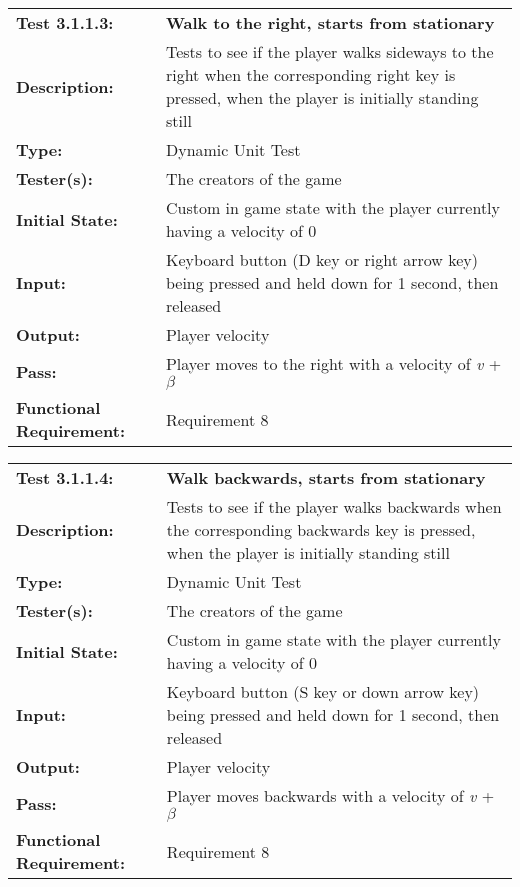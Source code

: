\documentclass[12pt, titlepage]{article}
\begin{document}
\begin{mdframed}[linewidth=1pt]
\begin{tabularx}{\textwidth}{@{}p{3cm}X@{}}
{\bf Test 3.1.1.3:} & {\bf Walk to the right, starts from stationary}\\[\baselineskip]
{\bf Description:} & Tests to see if the player walks sideways to the right when the corresponding right key is pressed, when the player is initially standing still\\[0.5\baselineskip]
{\bf Type:} & Dynamic Unit Test\\[0.5\baselineskip]
{\bf Tester(s):} & The creators of the game\\[0.5\baselineskip]
{\bf Initial State:} & Custom in game state with the player currently having a velocity of 0\\[0.5\baselineskip]
{\bf Input:} & Keyboard button (D key or right arrow key) being pressed and held down for 1 second, then released\\[0.5\baselineskip]
{\bf Output:} & Player velocity\\[0.5\baselineskip]
{\bf Pass:} & Player moves to the right with a velocity of \textit{v} + $\beta$ \\[0.5\baselineskip]
{\bf Functional Requirement:} & Requirement 8
\end{tabularx}
\end{mdframed}

\begin{mdframed}[linewidth=1pt]
\begin{tabularx}{\textwidth}{@{}p{3cm}X@{}}
{\bf Test 3.1.1.4:} & {\bf Walk backwards, starts from stationary}\\[\baselineskip]
{\bf Description:} & Tests to see if the player walks backwards when the corresponding backwards key is pressed, when the player is initially standing still\\[0.5\baselineskip]
{\bf Type:} & Dynamic Unit Test\\[0.5\baselineskip]
{\bf Tester(s):} & The creators of the game\\[0.5\baselineskip]
{\bf Initial State:} & Custom in game state with the player currently having a velocity of 0\\[0.5\baselineskip]
{\bf Input:} & Keyboard button (S key or down arrow key) being pressed and held down for 1 second, then released\\[0.5\baselineskip]
{\bf Output:} & Player velocity\\[0.5\baselineskip]
{\bf Pass:} & Player moves backwards with a velocity of \textit{v} + $\beta$ \\[0.5\baselineskip]
{\bf Functional Requirement:} & Requirement 8
\end{tabularx}
\end{mdframed}
\end{document}
